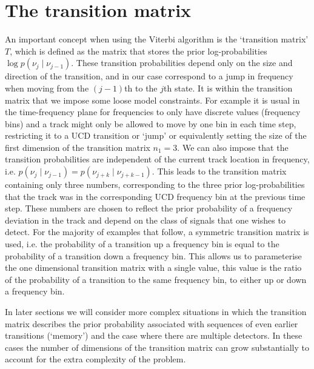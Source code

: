 \section{\label{soap:viterbi:transition}The transition matrix}
%
%
An important concept when using the Viterbi algorithm is the `transition matrix' $T$, which is defined as the matrix that stores the prior log-probabilities $\log p(\nu_j \mid \nu_{j-1})$. These transition probabilities depend only on the size and direction of the transition, and in our case correspond to a jump in frequency when moving from the $(j-1)$th to the $j$th state. It is within the transition matrix that we impose some loose model constraints. For example it is usual in the time-frequency plane for frequencies to only have discrete values (frequency bins) and a track might only be allowed to move by one bin in each time step, restricting it to a \gls{UCD} transition or `jump' or equivalently setting the size of the first dimension of the transition matrix $n_1 = 3$. We can also impose that the transition probabilities are independent of the current track location in frequency, i.e. $p(\nu_j \mid \nu_{j-1})=p(\nu_{j+k} \mid \nu_{j+k-1})$. This leads to the transition matrix containing only three numbers, corresponding to the three prior log-probabilities that the track was in the corresponding \gls{UCD} frequency bin at the previous time step. These numbers are chosen to reflect the prior probability of a frequency deviation in the track and depend on the class of signals that one wishes to detect.
For the majority of examples that follow, a symmetric transition matrix is used, i.e. the probability of a transition up a frequency bin is equal to the probability of a transition down a frequency bin. This allows us to parameterise the one dimensional transition matrix with a single value, this value is the ratio of the probability of a transition to the same frequency bin, to either up or down a frequency bin. 

In later sections we will consider more complex situations in which the transition matrix describes the prior probability associated with sequences of even earlier transitions (`memory') and the case where there are multiple detectors. In these cases the number of dimensions of the transition matrix can grow substantially to account for the extra complexity of the problem.

